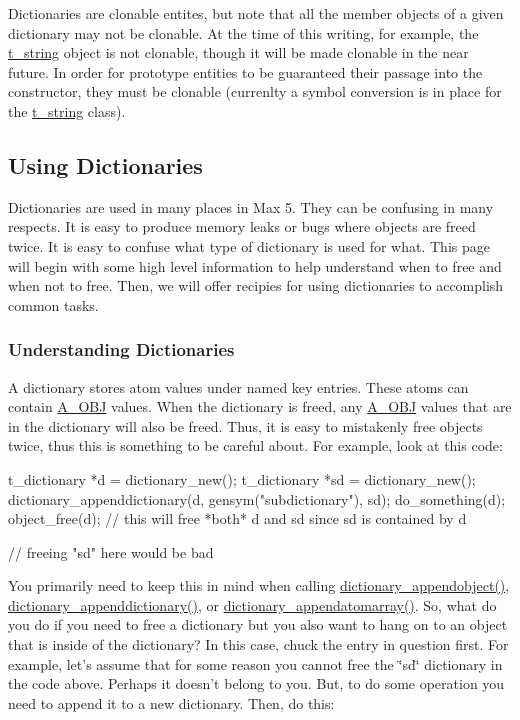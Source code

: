 Dictionaries are clonable entites, but note that all the member objects of a given dictionary may not be clonable. At the time of this writing, for example, the \hyperlink{structt__string}{t\_\-string} object is not clonable, though it will be made clonable in the near future. In order for prototype entities to be guaranteed their passage into the constructor, they must be clonable (currenlty a symbol conversion is in place for the \hyperlink{structt__string}{t\_\-string} class).\hypertarget{group__dictionary_using_dictionaries}{}\subsection{Using Dictionaries}\label{group__dictionary_using_dictionaries}
Dictionaries are used in many places in Max 5. They can be confusing in many respects. It is easy to produce memory leaks or bugs where objects are freed twice. It is easy to confuse what type of dictionary is used for what. This page will begin with some high level information to help understand when to free and when not to free. Then, we will offer recipies for using dictionaries to accomplish common tasks.\hypertarget{group__dictionary_understanding_dictionaries}{}\subsubsection{Understanding Dictionaries}\label{group__dictionary_understanding_dictionaries}
A dictionary stores atom values under named key entries. These atoms can contain \hyperlink{group__atom_gga8aa6700e9f00b132eb376db6e39ade47a82cc76e0d53c8fc28df167c35d5bbd1a}{A\_\-OBJ} values. When the dictionary is freed, any \hyperlink{group__atom_gga8aa6700e9f00b132eb376db6e39ade47a82cc76e0d53c8fc28df167c35d5bbd1a}{A\_\-OBJ} values that are in the dictionary will also be freed. Thus, it is easy to mistakenly free objects twice, thus this is something to be careful about. For example, look at this code:


\begin{DoxyCode}
    t_dictionary *d = dictionary_new(); 
    t_dictionary *sd = dictionary_new();  
    dictionary_appenddictionary(d, gensym("subdictionary"), sd); 
    do_something(d);
    object_free(d);  // this will free *both* d and sd since sd is contained by d
      
    // freeing "sd" here would be bad
\end{DoxyCode}


You primarily need to keep this in mind when calling \hyperlink{group__dictionary_ga64e86e71b47a2d9719a43ec8bd376591}{dictionary\_\-appendobject()}, \hyperlink{group__dictionary_ga1bd7575368917037f46b5b9076e167c7}{dictionary\_\-appenddictionary()}, or \hyperlink{group__dictionary_gac1f0f17da56b71ef6f21c972535ee609}{dictionary\_\-appendatomarray()}. So, what do you do if you need to free a dictionary but you also want to hang on to an object that is inside of the dictionary? In this case, chuck the entry in question first. For example, let's assume that for some reason you cannot free the \char`\"{}sd\char`\"{} dictionary in the code above. Perhaps it doesn't belong to you. But, to do some operation you need to append it to a new dictionary. Then, do this:


